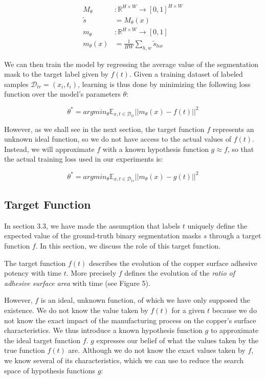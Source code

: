 \documentclass[10pt,twocolumn,letterpaper]{article}
\begin{document}
\begin{subequations}
\begin{align}
M_{\theta}&: \mathbb{R}^{H \times W} \rightarrow [0,1]^{H \times W} \\
\tilde{s}&= M_{\theta}(x) \\
m_{\theta}&:  \mathbb{R}^{H \times W} \rightarrow [0,1]\\
m_{\theta}(x)&=  \frac{1}{HW} \sum_{h,w} \tilde{s}_{hw}
\end{align}
\end{subequations}

We can then train the model by regressing the average value of the segmentation mask to the
target label given by $f(t)$. 
Given a training dataset of labeled samples $\mathcal{D}_{tr}={(x_i, t_i)}$,
learning is thus done by minimizing the following loss function over the model's parameters $\theta$:

\begin{equation}
\theta^* = argmin_{\theta} \mathbb{E}_{x,t \in \mathcal{D}_{tr}} ||m_{\theta}(x) - f(t) ||^2 
\end{equation}

However, as we shall see in the next section, 
the target function $f$ represents an unknown ideal function,
so we do not have access to the actual values of $f(t)$.
Instead, we will approximate $f$ with a known hypothesis function $g \approx f$,
so that the actual training loss used in our experiments is:

\begin{equation}
\theta^* = argmin_{\theta} \mathbb{E}_{x,t \in \mathcal{D}_{tr}} ||m_{\theta}(x) - g(t) ||^2 
\end{equation}

\subsection{Target Function}

In section 3.3, we have made the assumption 
that labels $t$ uniquely define the expected value 
of the ground-truth binary segmentation masks $s$ through a target function $f$.
In this section, we discuss the role of this target function.

The target function $f(t)$ describes the evolution of the copper surface adhesive potency with time $t$.
More precisely $f$ defines the evolution of the \textit{ratio of adhesive surface area} with time (see Figure 5).

However, $f$ is an ideal, unknown function, of which we have only supposed the existence.
We do not know the value taken by $f(t)$ for a given $t$ because we 
do not know the exact impact of the manufacturing process on the copper's surface characteristics.
We thus introduce a known hypothesis function $g$ to approximate the ideal target function $f$.
$g$ expresses our belief of what the values taken by the true function $f(t)$ are.
Although we do not know the exact values taken by $f$, we know several of its characteristics,
which we can use to reduce the search space of hypothesis functions $g$:
\end{document}

